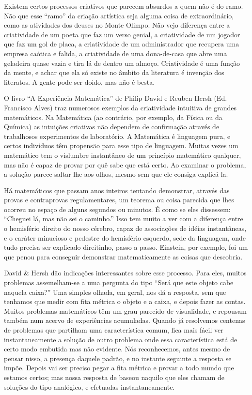 Existem certos processos criativos que parecem absurdos a quem não é
do ramo. Não que esse “ramo” da criação artística seja alguma coisa
de extraordinário, como as atividades dos deuses no Monte Olimpo. Não
vejo diferença entre a criatividade de um poeta que faz um verso
genial, a criatividade de um jogador que faz um gol de placa, a
criatividade de um administrador que recupera uma empresa caótica e
falida, a criatividade de uma dona-de-casa que abre uma geladeira
quase vazia e tira lá de dentro um almoço. Criatividade é uma função
da mente, e achar que ela só existe no âmbito da literatura é
invenção dos literatos. A gente pode ser doido, mas não é besta.

O livro “A Experiência Matemática” de Philip David e Reuben Hersh (Ed.
Francisco Alves) traz numerosos exemplos da criatividade intuitiva de
grandes matemáticos. Na Matemática (ao contrário, por exemplo, da
Física ou da Química) as intuições criativas não dependem de
confirmação através de trabalhosos experimentos de laboratório. A
Matemática é linguagem pura, e certos indivíduos têm propensão para
esse tipo de linguagem. Muitas vezes um matemático tem o vislumbre
instantâneo de um princípio matemático qualquer, mas não é capaz de
provar por quê sabe que está certo. Ao examinar o problema, a solução
parece saltar-lhe aos olhos, mesmo sem que ele consiga explicá-la.

Há matemáticos que passam anos inteiros tentando demonstrar, através
das provas e contraprovas regulamentares, um teorema ou coisa
parecida que lhes ocorreu no espaço de alguns segundos ou minutos. É
como se eles dissessem: “Cheguei lá, mas não sei o caminho.” Isso tem
muito a ver com a diferença entre o hemisfério direito do nosso
cérebro, capaz de associações de idéias instantâneas, e o caráter
minucioso e pedestre do hemisfério esquerdo, sede da linguagem, onde
tudo precisa ser explicado direitinho, passo a passo. Einstein, por
exemplo, foi um que penou para conseguir demonstrar matematicamente
as coisas que descobria.

David \& Hersh dão indicações interessantes sobre esse processo. Para
eles, muitos problemas assemelham-se a uma pergunta do tipo “Será que
este objeto cabe naquela caixa?” Uma simples olhada, em geral, nos dá
a resposta, sem que tenhamos que medir com fita métrica o objeto e a
caixa, e depois fazer as contas. Muitos problemas matemáticos têm um
grau parecido de visualidade, e repousam também num acervo de
experiências acumuladas. Quando já resolvemos centenas de problemas
que partilham uma característica comum, fica mais fácil ver
instantaneamente a solução de outro problema onde essa característica
está de certo modo embutida mas não evidente. Nós reconhecemos, antes
mesmo de pensar nisso, a presença daquele padrão, e no instante
seguinte a resposta se impõe. Depois vai ser preciso pegar a fita
métrica e provar a todo mundo que estamos certos; mas nossa resposta
de baseou naquilo que eles chamam de soluções do tipo analógico, e
efetuadas instantaneamente.

